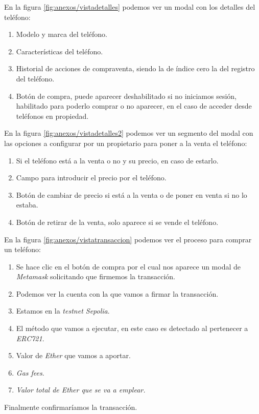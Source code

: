 En la figura \ref{fig:anexos/vistadetalles} podemos ver un modal con los detalles del teléfono:
\begin{enumerate}
    \item Modelo y marca del teléfono.
    \item Características del teléfono.
    \item Historial de acciones de compraventa, siendo la de índice cero la del registro del teléfono.
    \item Botón de compra, puede aparecer deshabilitado si no iniciamos sesión, habilitado para poderlo comprar o no aparecer, en el caso de acceder desde teléfonos en propiedad.
\end{enumerate}


En la figura \ref{fig:anexos/vistadetalles2} podemos ver un segmento del modal con las opciones a configurar por un propietario para poner a la venta el teléfono:
\begin{enumerate}
    \item Si el teléfono está a la venta o no y su precio, en caso de estarlo.
    \item Campo para introducir el precio por el teléfono.
    \item Botón de cambiar de precio si está a la venta o de poner en venta si no lo estaba.
    \item Botón de retirar de la venta, solo aparece si se vende el teléfono.
\end{enumerate}


En la figura \ref{fig:anexos/vistatransaccion} podemos ver el proceso para comprar un teléfono:
\begin{enumerate}
    \item Se hace clic en el botón de compra por el cual nos aparece un modal de \textit{Metamask} solicitando que firmemos la transacción.
    \item Podemos ver la cuenta con la que vamos a firmar la transacción.
    \item Estamos en la \textit{testnet Sepolia}.
    \item El método que vamos a ejecutar, en este caso es detectado al pertenecer a \textit{ERC721}.
    \item Valor de \textit{Ether} que vamos a aportar.
    \item \textit{Gas fees}.
    \item \textit{Valor total de \textit{Ether} que se va a emplear.}
\end{enumerate}
Finalmente confirmaríamos la transacción.

